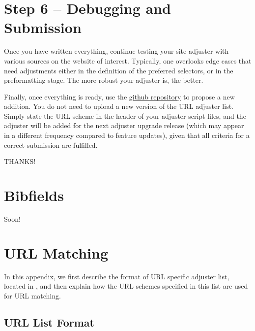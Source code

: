 \documentclass[
a4paper,
12pt,
]
{article}
\begin{document}
\section{Step 6 -- Debugging and Submission}\label{sec_6}

Once you have written everything, continue testing your site adjuster with various sources on the website of interest. Typically, one overlooks edge cases that need adjustments either in the definition of the preferred selectors, or in the preformatting stage. The more robust your adjuster is, the better.\par

Finally, once everything is ready, use the \href{https://github.com/Langenscheiss/bibitnow}{github repository} to propose a new addition. You do not need to upload a new version of the URL adjuster list. Simply state the URL scheme in the header of your adjuster script files, and the adjuster will be added for the next adjuster upgrade release (which may appear in a different frequency compared to feature updates), given that all criteria for a correct submission are fulfilled.

THANKS!

\appendix
 \section{Bibfields}\label{app_bibfields}
 
 Soon!
 
 \section{URL Matching}\label{app_matching}
 
 In this appendix, we first describe the format of URL specific adjuster list, located in
 , 
 and then explain how the URL schemes specified in this list are used for URL matching.
 
 \subsection{URL List Format}\label{app_matching_list}
 
\end{document}
